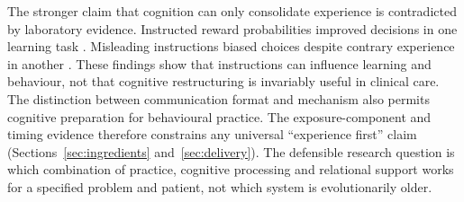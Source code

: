 The stronger claim that cognition can only consolidate experience is contradicted by laboratory evidence.
Instructed reward probabilities improved decisions in one learning task \citep{li2011instructed}.
Misleading instructions biased choices despite contrary experience in another \citep{doll2009instruction}.
These findings show that instructions can influence learning and behaviour, not that cognitive restructuring is invariably useful in clinical care.
The distinction between communication format and mechanism also permits cognitive preparation for behavioural practice.
The exposure-component and timing evidence therefore constrains any universal ``experience first'' claim (Sections~\ref{sec:ingredients} and~\ref{sec:delivery}).
The defensible research question is which combination of practice, cognitive processing and relational support works for a specified problem and patient, not which system is evolutionarily older.
